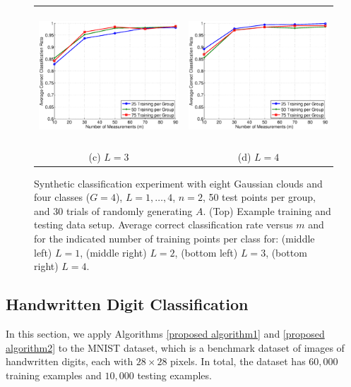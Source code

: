 \documentclass[twoside,11pt]{article}
\begin{document}
\begin{figure}[!htbp]
\begin{tabular}{cc}
\includegraphics[height=2in]{images/Synthetic/8ball_g4_d2/synthetic_5d.eps} &
\includegraphics[height=2in]{images/Synthetic/8ball_g4_d2/synthetic_5e.eps} \\
(c) $L=3$ & (d) $L=4$ \\
\end{tabular}
\caption{Synthetic classification experiment with eight Gaussian clouds and four classes ($G=4$), $L=1,\dots,4$, $n=2$, 50 test points per group, and 30 trials of randomly generating $A$. (Top) Example training and testing data setup. Average correct classification rate versus $m$ and for the indicated number of training points per class for: (middle left) $L=1$, (middle right) $L=2$, (bottom left) $L=3$, (bottom right) $L=4$.}
\label{syn:gaussian4 alternating8}
\end{figure}

\subsection{Handwritten Digit Classification}

In this section, we apply Algorithms \ref{proposed algorithm1} and \ref{proposed algorithm2} to the MNIST \citep{MNIST} dataset, which is a benchmark dataset of images of handwritten digits, each with $28 \times 28$ pixels. In total, the dataset has $60,000$ training examples and $10,000$ testing examples. 
\end{document}
